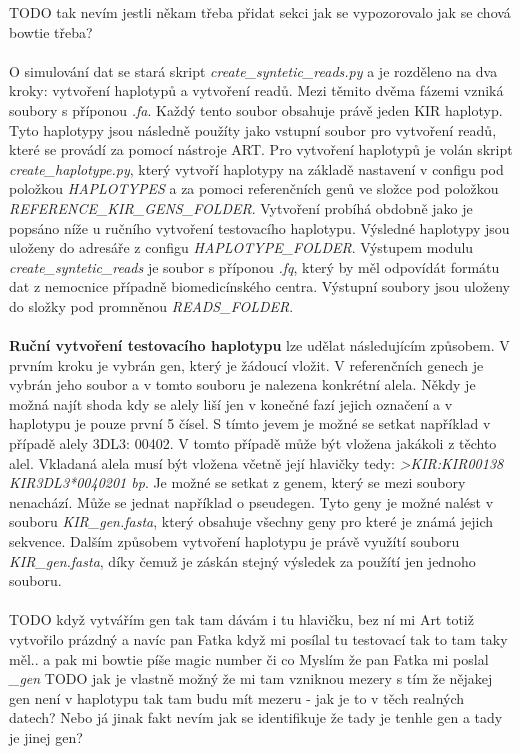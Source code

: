\documentclass[czech,DP]{thesiskiv}
\numberwithin{equation}{section}
\begin{document}
TODO tak nevím jestli někam třeba přidat sekci jak se vypozorovalo jak se chová bowtie třeba?
\\
\\
O simulování dat se stará skript \textit{create\_syntetic\_reads.py} a je rozděleno na dva kroky: vytvoření haplotypů a vytvoření readů. Mezi těmito dvěma fázemi vzniká soubory s příponou \textit{.fa}. Každý tento soubor obsahuje právě jeden KIR haplotyp. Tyto haplotypy jsou následně použíty jako vstupní soubor pro vytvoření readů, které se provádí za pomocí nástroje ART. Pro vytvoření haplotypů je volán skript \textit{create\_haplotype.py}, který vytvoří haplotypy na základě nastavení v configu pod položkou \textit{HAPLOTYPES} a za pomoci referenčních genů ve složce pod položkou \textit{REFERENCE\_KIR\_GENS\_FOLDER}. Vytvoření probíhá obdobně jako je popsáno níže u ručního vytvoření testovacího haplotypu. Výsledné haplotypy jsou uloženy do adresáře z configu \textit{HAPLOTYPE\_FOLDER}. Výstupem modulu \textit{create\_syntetic\_reads} je soubor s příponou \textit{.fq}, který by měl odpovídát formátu dat z nemocnice případně biomedicínského centra. Výstupní soubory jsou uloženy do složky pod promněnou \textit{READS\_FOLDER}.
\\
\\
\textbf{Ruční vytvoření testovacího haplotypu} lze udělat následujícím způsobem. V prvním kroku je vybrán gen, který je žádoucí vložit. V referenčních genech je vybrán jeho soubor a v tomto souboru je nalezena konkrétní alela. Někdy je možná najít shoda kdy se alely liší jen v konečné fazí jejich označení a v haplotypu je pouze první 5 čísel. S tímto jevem je možné se setkat například v případě alely 3DL3: 00402. V tomto případě může být vložena jakákoli z těchto alel. Vkladaná alela musí být vložena včetně její hlavičky tedy: \textit{>KIR:KIR00138 \: KIR3DL3*0040201  \: bp}. Je možné se setkat z genem, který se mezi soubory nenachází. Může se jednat například o pseudegen. Tyto geny je možné nalést v souboru \textit{KIR\_gen.fasta}, který obsahuje všechny geny pro které je známá jejich sekvence. Dalším způsobem vytvoření haplotypu je právě využítí souboru \textit{KIR\_gen.fasta}, díky čemuž je záskán stejný výsledek za použítí jen jednoho souboru. 
\\
\\
TODO když vytvářím gen tak tam dávám i tu hlavičku, bez ní mi Art totiž vytvořilo prázdný a navíc pan Fatka když mi posílal tu testovací tak to tam taky měl.. a pak mi bowtie píše magic number či co 
Myslím že pan Fatka mi poslal \textit{\_gen}
TODO jak je vlastně možný že mi tam vzniknou mezery s tím že nějakej gen není v haplotypu tak tam budu mít mezeru - jak je to v těch realných datech?
Nebo já jinak fakt nevím jak se identifikuje že tady je tenhle gen a tady je jinej gen?  
\end{document}
